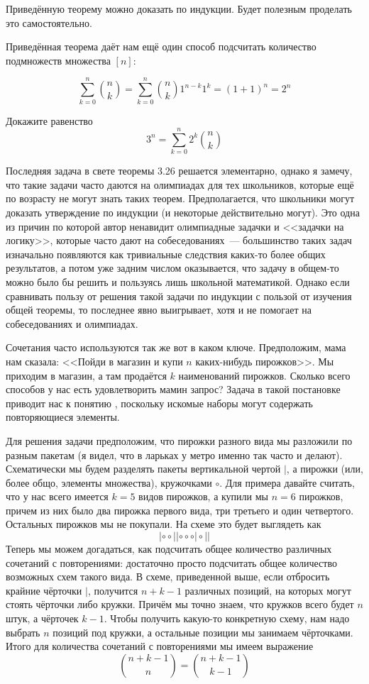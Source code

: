 \begin{exercise}
Приведённую теорему можно доказать по индукции. Будет полезным проделать это самостоятельно.
\end{exercise}

Приведённая теорема даёт нам ещё один способ подсчитать количество подмножеств множества $[n]$:

$$\sum_{k=0}^n {n \choose k} = \sum_{k=0}^n {n \choose k}1^{n-k}1^k = (1+1)^n = 2^n$$

\begin{exercise}
Докажите равенство
$$3^n = \sum_{k=0}^{n} 2^k {n \choose k}$$
\end{exercise}

Последняя задача в свете теоремы 3.26 решается элементарно, однако я замечу, что такие задачи часто даются на олимпиадах для тех школьников, которые ещё по возрасту не могут знать таких теорем. Предполагается, что школьники могут доказать утверждение по индукции (и некоторые действительно могут). Это одна из причин по которой автор ненавидит олимпиадные задачки и <<задачки на логику>>, которые часто дают на собеседованиях~--- большинство таких задач изначально появляются как тривиальные следствия каких-то более общих результатов, а потом уже задним числом оказывается, что задачу в общем-то можно было бы решить и пользуясь лишь школьной математикой. Однако если сравнивать пользу от решения такой задачи по индукции с пользой от изучения общей теоремы, то последнее явно выигрывает, хотя и не помогает на собеседованиях и олимпиадах.

Сочетания часто используются так же вот в каком ключе. Предположим, мама нам сказала: <<Пойди в магазин и купи $n$ каких-нибудь пирожков>>. Мы приходим в магазин, а там продаётся $k$ наименований пирожков. Сколько всего способов у нас есть удовлетворить мамин запрос? Задача в такой постановке приводит нас к понятию , поскольку искомые наборы могут содержать повторяющиеся элементы.

Для решения задачи предположим, что пирожки разного вида мы разложили по разным пакетам (я видел, что в ларьках у метро именно так часто и делают). Схематически мы будем разделять пакеты вертикальной чертой $|$, а пирожки (или, более общо, элементы множества), кружочками $\circ$. Для примера давайте считать, что у нас всего имеется $k=5$ видов пирожков, а купили мы $n=6$ пирожков, причем из них было два пирожка первого вида, три третьего и один четвертого. Остальных пирожков мы не покупали. На схеме это будет выглядеть как
$$|\circ\circ||\circ\circ\circ|\circ||$$
Теперь мы можем догадаться, как подсчитать общее количество различных сочетаний с повторениями: достаточно просто подсчитать общее количество возможных схем такого вида. В схеме, приведенной выше, если отбросить крайние чёрточки $|$, получится $n+k-1$ различных позиций, на которых могут стоять чёрточки либо кружки. Причём мы точно знаем, что кружков всего будет $n$ штук, а чёрточек $k-1$. Чтобы получить какую-то конкретную схему, нам надо выбрать $n$ позиций под кружки, а остальные позиции мы занимаем чёрточками. Итого для количества сочетаний с повторениями мы имеем выражение
$${n+k-1 \choose n} = {n+k-1\choose k - 1}$$

